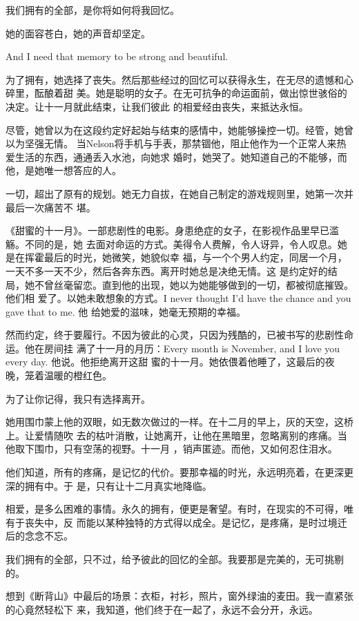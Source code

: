 \documentclass[12pt,a4paper]{article}
\begin{document}
		我们拥有的全部，是你将如何将我回忆。

		她的面容苍白，她的声音却坚定。

		And I need that memory to be strong and beautiful.

		为了拥有，她选择了丧失。然后那些经过的回忆可以获得永生，在无尽的遗憾和心碎里，酝酿着甜
	美。她是聪明的女子。在无可抗争的命运面前，做出惊世骇俗的决定。让十一月就此结束，让我们彼此
	的相爱经由丧失，来抵达永恒。

		尽管，她曾以为在这段约定好起始与结束的感情中，她能够操控一切。经管，她曾以为坚强无情。
	当Nelson将手机与手表，那禁锢他，阻止他作为一个正常人来热爱生活的东西，通通丢入水池，向她求
	婚时，她哭了。她知道自己的不能够，而他，是她唯一想答应的人。

		一切，超出了原有的规划。她无力自拔，在她自己制定的游戏规则里，她第一次并最后一次痛苦不
	堪。

		《甜蜜的十一月》。一部悲剧性的电影。身患绝症的女子，在影视作品里早已滥觞。不同的是，她
	去面对命运的方式。美得令人费解，令人讶异，令人叹息。她是在挥霍最后的时光，她微笑，她貌似幸
	福，与一个个男人约定，同居一个月，一天不多一天不少，然后各奔东西。离开时她总是决绝无情。这
	是约定好的结局，她不曾丝毫留恋。直到他的出现，她以为她能够做到的一切，都被彻底摧毁。他们相
	爱了。以她未敢想象的方式。I never thought I'd have the chance and you gave that to me. 他
	给她爱的滋味，她毫无预期的幸福。

		然而约定，终于要履行。不因为彼此的心灵，只因为残酷的，已被书写的悲剧性命运。他在房间挂
	满了十一月的月历：Every month is November, and I love you every day. 他说。他拒绝离开这甜
	蜜的十一月。她依偎着他睡了，这最后的夜晚，笼着温暖的橙红色。

		为了让你记得，我只有选择离开。

		她用围巾蒙上他的双眼，如无数次做过的一样。在十二月的早上，灰的天空，这桥上。让爱情随吹
	去的枯叶消散，让她离开，让他在黑暗里，忽略离别的疼痛。当他取下围巾，只有空荡的视野。十一月
	，销声匿迹。而他，又如何忍住泪水。

		他们知道，所有的疼痛，是记忆的代价。要那幸福的时光，永远明亮着，在更深更深的拥有中。于
	是，只有让十二月真实地降临。

		相爱，是多么困难的事情。永久的拥有，便更是奢望。有时，在现实的不可得，唯有于丧失中，反
	而能以某种独特的方式得以成全。是记忆，是疼痛，是时过境迁后的念念不忘。

		我们拥有的全部，只不过，给予彼此的回忆的全部。我要那是完美的，无可挑剔的。

		想到《断背山》中最后的场景：衣柜，衬衫，照片，窗外绿油的麦田。我一直紧张的心竟然轻松下
	来，我知道，他们终于在一起了，永远不会分开，永远。
\end{document}

